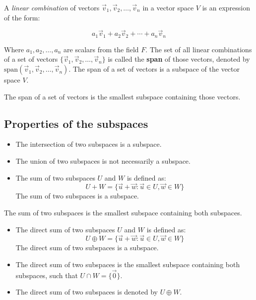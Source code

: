 A \emph{linear combination} of vectors \(\vec{v}_1, \vec{v}_2, \ldots, \vec{v}_n\) in a vector space 
\(V\) is an expression of the form:

\[
	a_1\vec{v}_1 + a_2\vec{v}_2 + \cdots + a_n\vec{v}_n
\]

Where \(a_1, a_2, \ldots, a_n\) are scalars from the field \(F\).
The set of all linear combinations of a set of vectors \(\{\vec{v}_1, \vec{v}_2, \ldots, \vec{v}_n\}\) 
is called the \textbf{span} of those vectors, 
denoted by \(\text{span}(\vec{v}_1, \vec{v}_2, \ldots, \vec{v}_n)\). The span of a set of vectors is a 
subspace of the vector space \(V\).
\vspace{\baselineskip}

The span of a set of vectors is the smallest subspace containing those vectors.

\subsection{Properties of the subspaces}

\begin{itemize}

	\item The intersection of two subspaces is a subspace.

	\item The union of two subspaces is not necessarily a subspace.

	\item The sum of two subspaces \(U\) and \(W\) is defined as:
	      \[
		      U + W = \{\vec{u} + \vec{w} : \vec{u} \in U, \vec{w} \in W\}
	      \]
	      The sum of two subspaces is a subspace.

		\end{itemize}

The sum of two subspaces is the smallest subspace containing both subspaces.

\begin{itemize}

	\item The direct sum of two subspaces \(U\) and \(W\) is defined as:
	      \[
		      U \oplus W = \{\vec{u} + \vec{w} : \vec{u} \in U, \vec{w} \in W\}
	      \]
	      The direct sum of two subspaces is a subspace.

	\item The direct sum of two subspaces is the smallest subspace containing both subspaces, such that 
		  \(U \cap W = \{\vec{0}\}\).

	\item The direct sum of two subspaces is denoted by \(U \oplus W\).

\end{itemize}


